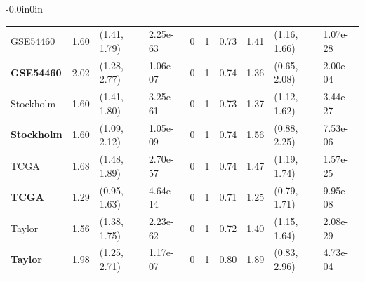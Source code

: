 \begin{table}[t]
\begin{adjustwidth}{-0.0in}{0in}
{\begin{tabular}{llllllllll}
  \toprule
  GSE54460 & 1.60 & (1.41, 1.79) & 2.25e-63 & 0 & 1 & 0.73 & 1.41 & (1.16, 1.66) & 1.07e-28 \\
  \textbf{GSE54460} & 2.02 & (1.28, 2.77) & 1.06e-07 & 0 & 1 & 0.74 & 1.36 & (0.65, 2.08) & 2.00e-04 \\
  \toprule
  Stockholm & 1.60 & (1.41, 1.80) & 3.25e-61 & 0 & 1 & 0.73 & 1.37 & (1.12, 1.62) & 3.44e-27 \\
  \textbf{Stockholm} & 1.60 & (1.09, 2.12) & 1.05e-09 & 0 & 1 & 0.74 & 1.56 & (0.88, 2.25) & 7.53e-06 \\
  \toprule
  TCGA & 1.68 & (1.48, 1.89) & 2.70e-57 & 0 & 1 & 0.74 & 1.47 & (1.19, 1.74) & 1.57e-25 \\
  \textbf{TCGA} & 1.29 & (0.95, 1.63) & 4.64e-14 & 0 & 1 & 0.71 & 1.25 & (0.79, 1.71) & 9.95e-08 \\
  \toprule
  Taylor & 1.56 & (1.38, 1.75) & 2.23e-62 & 0 & 1 & 0.72 & 1.40 & (1.15, 1.64) & 2.08e-29 \\
  \textbf{Taylor} & 1.98 & (1.25, 2.71) & 1.17e-07 & 0 & 1 & 0.80 & 1.89 & (0.83, 2.96) & 4.73e-04 \\

  \hline
  \end{tabular}
  }
  \end{adjustwidth}
\end{table}




